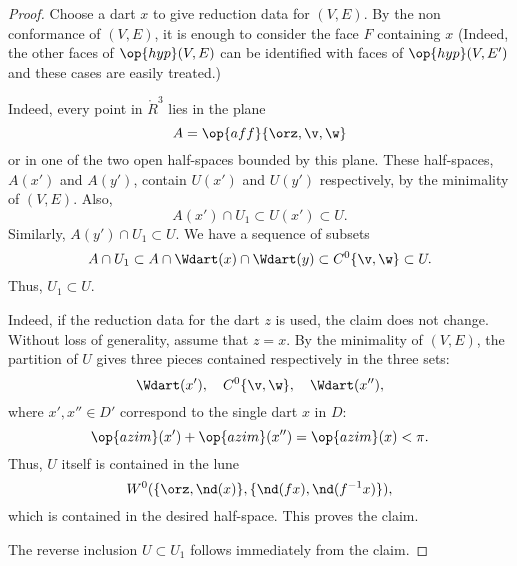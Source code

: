 \begin{proof}
  Choose a dart $x$ to give reduction data for $(V,E)$.  By the non
  conformance of $(V,E)$, it is enough to consider the face $F$
  containing $x$ (Indeed, the other faces of $\op{hyp}(V,E)$ can be
  identified with faces of $\op{hyp}(V,E')$ and these cases are easily
  treated.)  

Indeed,  every
  point in $\ring{R}^3$ lies in the plane
\begin{displaymath}
A=\op{aff}\{\orz,\v,\w\}
\end{displaymath}
or in one of the two open half-spaces bounded by this plane.  These
half-spaces, $A(x')$ and $A(y')$, contain $U(x')$ and $U(y')$
respectively, by the minimality of $(V,E)$.  Also,
\begin{displaymath}
A(x')\cap U_1 \subset U(x')\subset U.
\end{displaymath}
Similarly, $A(y')\cap U_1 \subset U$.  We have a sequence of subsets
\begin{displaymath}
A \cap U_1 \subset A \cap \Wdart(x) \cap \Wdart(y) \subset C^0\{\v,\w\} \subset U.
\end{displaymath}
Thus,
$U_1\subset U$.

 Indeed,
if the reduction data for the dart $z$ is used, the claim does not change.
Without loss of generality, assume that $z=x$.  By the minimality of $(V,E)$, the
partition  of $U$ gives three pieces contained respectively
in the three sets:
\begin{displaymath}
\Wdart(x'),\quad C^0\{\v,\w\},\quad \Wdart(x''),
\end{displaymath}
where $x',x''\in D'$ correspond to the single dart $x$ in $D$:
\begin{displaymath}
\op{azim}(x') + \op{azim}(x'') = \op{azim}(x) < \pi.
\end{displaymath}
Thus, $U$ itself is contained in the lune
\begin{displaymath}
W^0(\{\orz,\nd(x)\},\{\nd(f x),\nd(f^{-1} x)\}),
\end{displaymath}
which is contained in the desired half-space.  This proves the claim.

The reverse inclusion $U\subset U_1$ follows immediately from the claim.
\end{proof}

%


